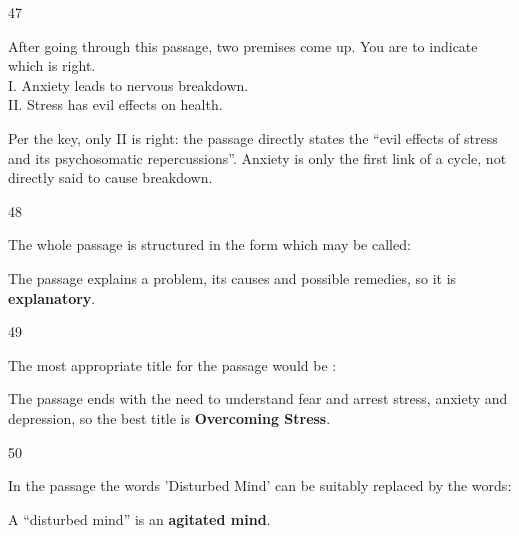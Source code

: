 \begin{question}{47}
{After going through this passage, two premises come up. You are to indicate which is right.\\
I. Anxiety leads to nervous breakdown.\\ II. Stress has evil effects on health.\par}
\begin{explain}
Per the key, only II is right: the passage directly states the ``evil effects of stress and its psychosomatic repercussions''. Anxiety is only the first link of a cycle, not directly said to cause breakdown.
\end{explain}
\end{question}

\begin{question}{48}
{The whole passage is structured in the form which may be called:\par}
\begin{explain}
The passage explains a problem, its causes and possible remedies, so it is \textbf{explanatory}.
\end{explain}
\end{question}

\begin{question}{49}
{The most appropriate title for the passage would be :\par}
\begin{explain}
The passage ends with the need to understand fear and arrest stress, anxiety and depression, so the best title is \textbf{Overcoming Stress}.
\end{explain}
\end{question}

\begin{question}{50}
{In the passage the words 'Disturbed Mind' can be suitably replaced by the words:\par}
\begin{explain}
A ``disturbed mind'' is an \textbf{agitated mind}.
\end{explain}
\end{question}
